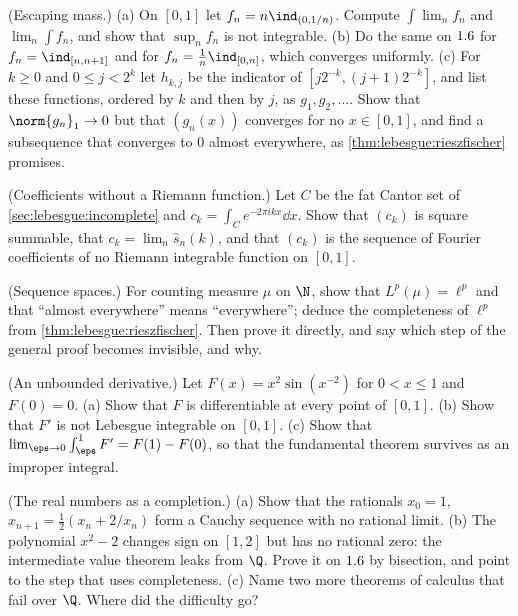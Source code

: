 \begin{refsection}
\begin{exercises}
\item\label{ex:lebesgue:escape} \consolidation (Escaping mass.) (a) On $[0,1]$ let $f_n=n\ind_{(0,1/n)}$. Compute $\int\lim_nf_n$ and $\lim_n\int f_n$, and show that $\sup_nf_n$ is not integrable. (b) Do the same on $1.6$ for $f_n=\ind_{[n,n+1]}$ and for $f_n=\frac1n\ind_{[0,n]}$, which converges uniformly. (c) For $k\ge0$ and $0\le j<2^k$ let $h_{k,j}$ be the indicator of $[j2^{-k},(j+1)2^{-k}]$, and list these functions, ordered by $k$ and then by $j$, as $g_1,g_2,\dots$. Show that $\norm{g_n}_1\to0$ but that $(g_n(x))$ converges for no $x\in[0,1]$, and find a subsequence that converges to $0$ almost everywhere, as \cref{thm:lebesgue:rieszfischer} promises.

\item\label{ex:lebesgue:fourier} \consolidation (Coefficients without a Riemann function.) Let $C$ be the fat Cantor set of \cref{sec:lebesgue:incomplete} and $c_k=\int_Ce^{-2\pi ikx}\dd x$. Show that $(c_k)$ is square summable, that $c_k=\lim_n\hat s_n(k)$, and that $(c_k)$ is the sequence of Fourier coefficients of no Riemann integrable function on $[0,1]$. 

\item\label{ex:lebesgue:lp} \consolidation (Sequence spaces.) For counting measure $\mu$ on $\N$, show that $L^p(\mu)=\ell^p$ and that ``almost everywhere'' means ``everywhere''; deduce the completeness of $\ell^p$ from \cref{thm:lebesgue:rieszfischer}. Then prove it directly, and say which step of the general proof becomes invisible, and why.

\item\label{ex:lebesgue:unbounded} \consolidation (An unbounded derivative.) Let $F(x)=x^2\sin(x^{-2})$ for $0<x\le1$ and $F(0)=0$. (a) Show that $F$ is differentiable at every point of $[0,1]$. (b) Show that $F'$ is not Lebesgue integrable on $[0,1]$.  (c) Show that $\lim_{\eps\to0}\int_\eps^1F'=F(1)-F(0)$, so that the fundamental theorem survives as an improper integral.

\item\label{ex:lebesgue:reals} \transfer (The real numbers as a completion.) (a) Show that the rationals $x_0=1$, $x_{n+1}=\frac12(x_n+2/x_n)$ form a Cauchy sequence with no rational limit. (b) The polynomial $x^2-2$ changes sign on $[1,2]$ but has no rational zero: the intermediate value theorem leaks from $\Q$. Prove it on $1.6$ by bisection, and point to the step that uses completeness. (c) Name two more theorems of calculus that fail over $\Q$. Where did the difficulty go?


\end{exercises}
\end{refsection}
